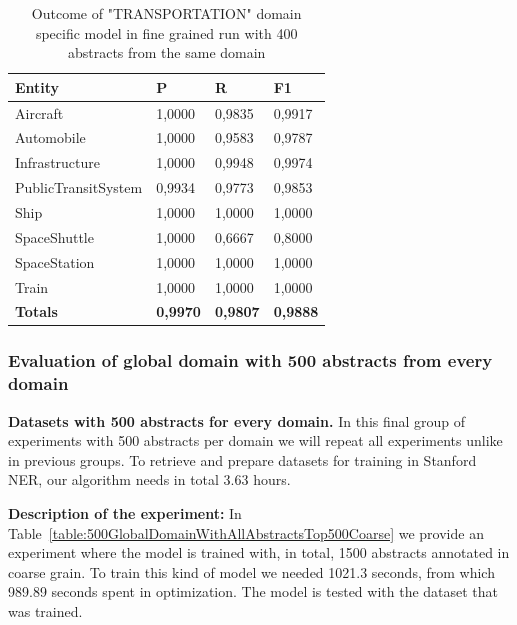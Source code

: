\documentclass[thesis=M,english]{FITthesis}[2018/05/30]
\begin{document}
	\begin{table}[H]\centering
		\begin{tabular}{|l|l|l|l|}
			\hline {\textbf{Entity}} & {\textbf{P}} & {\textbf{R}} & {\textbf{F1}}\\\hline
				Aircraft & 1,0000 & 0,9835 & 0,9917\\
				Automobile & 1,0000 & 0,9583 & 0,9787\\				
				Infrastructure & 1,0000 & 0,9948 & 0,9974\\
				PublicTransitSystem & 0,9934 & 0,9773 & 0,9853\\
				Ship & 1,0000 & 1,0000 & 1,0000\\				
				SpaceShuttle & 1,0000 & 0,6667 & 0,8000\\
				SpaceStation & 1,0000 & 1,0000 & 1,0000\\
				Train & 1,0000 & 1,0000 & 1,0000\\\hline
				\textbf{Totals} & \textbf{0,9970} & \textbf{0,9807} & \textbf{0,9888}\\\hline
		\end{tabular}
		\caption{Outcome of "TRANSPORTATION" domain specific model in fine grained run with 400 abstracts from the same domain \label{table:400TransportationDomainWithTransportationTop400Fine}}
	\end{table}	


\subsubsection{Evaluation of global domain with 500 abstracts from every domain }

\textbf{Datasets with 500 abstracts for every domain.} In this final group of experiments with 500 abstracts per domain we will repeat all experiments unlike in previous groups. To retrieve and prepare datasets for training in Stanford NER, our algorithm needs in total 3.63 hours.  

	\textbf{Description of the experiment:} In Table~\ref{table:500GlobalDomainWithAllAbstractsTop500Coarse} we provide an experiment where the model is trained with, in total, 1500 abstracts annotated in coarse grain. To train this kind of model we needed  1021.3 seconds, from which 989.89 seconds spent in optimization. The model is tested with the dataset that was trained. 
\end{document}
